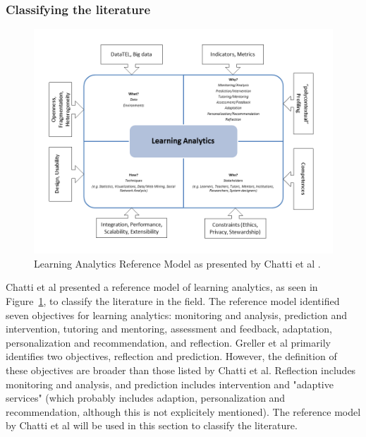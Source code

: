 \documentclass[11pt]{article}
\begin{document}
\subsubsection{Classifying the literature}
\begin{figure}[ht]
  \begin{center}
    \includegraphics[width=\linewidth]{referencemodel_chatti.png}
  \end{center}
  \caption{Learning Analytics Reference Model as presented by Chatti et al \cite{Chatti2012}.}
  \label{fig:reference_model_la}
\end{figure}
Chatti et al \cite{Chatti2012} presented a reference model of learning analytics, as seen in Figure~\ref{fig:reference_model_la}, to classify the literature in the field. The reference model identified seven objectives for learning analytics: monitoring and analysis, prediction and intervention, tutoring and mentoring, assessment and feedback, adaptation, personalization and recommendation, and reflection. Greller et al \cite{Greller2012} primarily identifies two objectives, reflection and prediction. However, the definition of these objectives are broader than those listed by Chatti et al. Reflection includes monitoring and analysis, and prediction includes intervention and "adaptive services" (which probably includes adaption, personalization and recommendation, although this is not explicitely mentioned). The reference model by Chatti et al will be used in this section to classify the literature.
\end{document}
